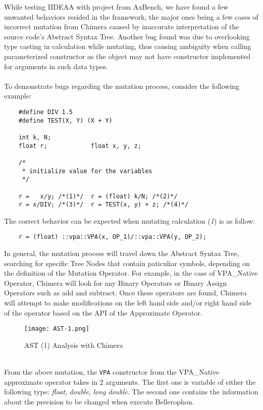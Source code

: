 While testing IIDEAA with project from AxBench, we have found a few unwanted behaviors resided in the framework, the major ones being a few cases of incorrect mutation from Chimera caused by inaccurate interpretation of the source code's Abstract Syntax Tree. Another bug found was due to overlooking type casting in calculation while mutating, thus causing ambiguity when calling parameterized constructor as the object may not have constructor implemented for arguments in such data types. \\
~\\
To demonstrate bugs regarding the mutation process, consider the following example: 
\begin{verbatim}
	#define DIV 1.5
	#define TEST(X, Y) (X + Y)
	
	int k, N;
	float r;			float x, y, z;
	
	/*
	 * initialize value for the variables
	 */
	
	r =   x/y; /*(1)*/	r = (float) k/N; /*(2)*/
	r = x/DIV; /*(3)*/	r = TEST(x, y) + z; /*(4)*/
\end{verbatim}
The correct behavior can be expected when mutating calculation (\textit{1}) is as follow:
\begin{verbatim}
	r = (float) ::vpa::VPA(x, OP_1)/::vpa::VPA(y, OP_2);
\end{verbatim}
In general, the mutation process will travel down the Abstract Syntax Tree, searching for specific Tree Nodes that contain paticuliar symbols, depending on the definition of the Mutation Operator. For example, in the case of VPA\_Native Operator, Chimera will look for any Binary Operators or Binary Assign Operators such as add and subtract. Once these operators are found, Chimera will attempt to make modifications on the left hand side and/or right hand side of the operator based on the API of the Approximate Operator. \\
\begin{figure}[H]
\texttt{[image: AST-1.png]}
\centering
\caption{AST (1) Analysis with Chimera}
\end{figure}
~\\
From the above mutation, the \verb|VPA| constructor from the VPA\_Native approximate operator takes in 2 arguments. The first one is variable of either the following type: \textit{float}, \textit{double}, \textit{long double}. The second one contains the information about the precision to be changed when execute Bellerophon. \\
